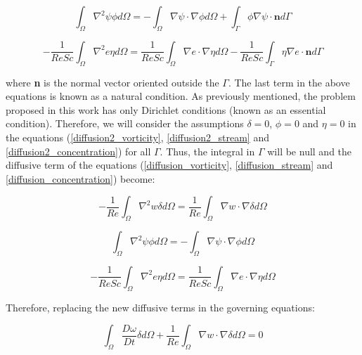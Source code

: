 \begin{equation} \label{diffusion2_stream} 
 \int_{\Omega} \nabla^2 \psi \phi d\Omega
 = - \int_{\Omega} \nabla \psi \cdot \nabla \phi d\Omega
   + \int_{\Gamma} \phi \nabla \psi \cdot \textbf{n} d\Gamma
\end{equation}

\begin{equation} \label{diffusion2_concentration} 
 - \frac{1}{\textit{ReSc}} \int_{\Omega} \nabla^2 e \eta d\Omega
 = \frac{1}{\textit{ReSc}} \int_{\Omega} \nabla e \cdot \nabla \eta d\Omega
 - \frac{1}{\textit{ReSc}} \int_{\Gamma} \eta \nabla e \cdot \textbf{n} d\Gamma
\end{equation}

\noindent
where \textbf{n} is the normal vector oriented outside the $\Gamma$. 
The last term in the above equations is known as a natural condition. 
As previously mentioned, 
the problem proposed in this work has only Dirichlet conditions 
(known as an essential condition).
Therefore,
we will consider the assumptions
$\delta = 0$, $\phi = 0$ and $\eta = 0$ in the equations (\ref{diffusion2_vorticity}, \ref{diffusion2_stream} and \ref{diffusion2_concentration})
for all $\Gamma$. 
Thus, 
the integral in $\Gamma$ will be null
and the diffusive term of the equations 
(\ref{diffusion_vorticity}, \ref{diffusion_stream} and \ref{diffusion_concentration}) become:

\begin{equation}
 - \frac{1}{\textit{Re}} \int_{\Omega} \nabla^2 w \delta d\Omega
 = \frac{1}{\textit{Re}} \int_{\Omega} \nabla w \cdot \nabla \delta d\Omega
\end{equation}

\begin{equation} 
 \int_{\Omega} \nabla^2 \psi \phi d\Omega
 = - \int_{\Omega} \nabla \psi \cdot \nabla \phi d\Omega
\end{equation}

\begin{equation} 
 - \frac{1}{\textit{ReSc}} \int_{\Omega} \nabla^2 e \eta d\Omega
 = \frac{1}{\textit{ReSc}} \int_{\Omega} \nabla e \cdot \nabla \eta d\Omega
\end{equation}

\medskip
\noindent
Therefore, replacing the new diffusive terms in the governing equations:

\begin{equation} \label{vorticity weak} 
   \int_{\Omega} \frac{D \omega}{Dt} \delta d\Omega 
 + \frac{1}{\textit{Re}} \int_{\Omega} \nabla w \cdot \nabla \delta d\Omega 
 = 0
\end{equation}

